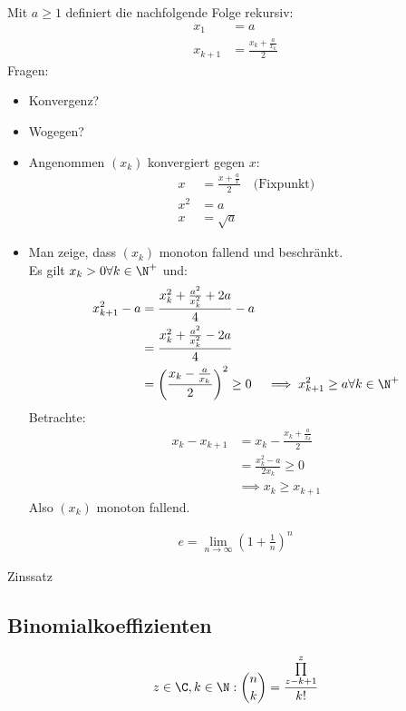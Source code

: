 \begin{example}
	Mit $a\geq 1$ definiert die nachfolgende Folge rekursiv:
	\begin{align*}
		x_1&=a\\
		x_{k+1}&=\frac{x_k+\frac{a}{x_k}}{2}
	\end{align*}
	Fragen:
	\begin{itemize}
		\item[(i)] Konvergenz?
		\item[(ii)] Wogegen?
	\end{itemize}
	\begin{itemize}
		\item[(ii)] Angenommen $(x_k)$ konvergiert gegen $x$:
		\begin{align*}
			x&=\frac{x+\frac{a}{x}}{2} \quad\text{(Fixpunkt)}\\
			x^2&=a\\
			x&=\sqrt{a}
		\end{align*}
		\item[[i)] Man zeige, dass $(x_k)$ monoton fallend und beschränkt.\\
		Es gilt $x_k>0 \forall k \in \N^+$ und:
		\begin{align*}
			x_{k+1}^2-a&=\frac{x_k^2+\frac{a^2}{x_k^2}+2a}{4}-a\\
			&=\frac{x_k^2+\frac{a^2}{x_k^2}-2a}{4}\\
			&=\left(\frac{x_k-\frac{a}{x_k}}{2}\right)^2\geq 0
			&\implies x_{k+1}^2\geq a \forall k \in \N^+
		\end{align*}
		Betrachte:
		\begin{align*}
			x_k-x_{k+1}&=x_k-\frac{x_k+\frac{a}{x_k}}{2}\\
			&=\frac{x_k^2-a}{2x_k} \geq 0\\
			&\implies x_k \geq x_{k+1}
		\end{align*}
		Also $(x_k)$ monoton fallend.
	\end{itemize}
\end{example}
\begin{definition}
	\begin{align*}
		e=\lim\limits_{n\to\infty} \left(1+\frac{1}{n}\right)^n
	\end{align*}
\end{definition}
\begin{example}
	Zinssatz
\end{example}
\subsection{Binomialkoeffizienten}
\begin{definition}
	\begin{align*}
		z\in \C, k\in \N: \binom{n}{k}=\frac{\prod\limits_{z-k+1}^z}{k!}
	\end{align*}
\end{definition}

